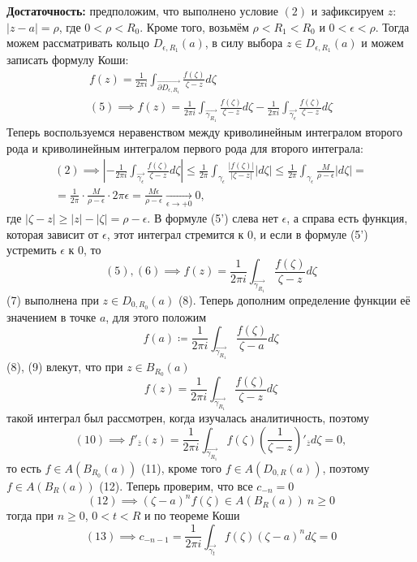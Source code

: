 \documentclass[main]{subfiles}
\begin{document}
\begin{longProof}
    \textbf{Достаточность:} предположим, что выполнено условие $(2)$ и зафиксируем $z$: $|z - a| = \rho$, где $0 < \rho < R_0$.
    Кроме того, возьмём $\rho < R_1 < R_0$ и $0 < \epsilon < \rho$.
    Тогда можем рассматривать кольцо $D_{\epsilon, R_1}(a)$, в силу выбора $z \in D_{\epsilon, R_1}(a)$ и можем записать формулу Коши:
    \begin{gather*}
        f(z) = \frac{1}{2 \pi i} \int_{\overrightarrow{\partial D_{\epsilon, R_1}}} \frac{f(\zeta)}{\zeta - z} d\zeta \tag{5}\\
        (5) \implies f(z) = \frac{1}{2 \pi i } \int_{\overrightarrow{\gamma_{R_1}}} \frac{f(\zeta)}{\zeta - z} d\zeta - \frac{1}{2 \pi i } \int_{\overrightarrow{\gamma_{\epsilon}}} \frac{f(\zeta)}{\zeta - z} d\zeta \tag{5'}
    \end{gather*}
    Теперь воспользуемся неравенством между криволинейным интегралом второго рода и криволинейным интегралом первого рода для второго интеграла:
    \begin{multline*}
        (2) \implies \left| - \frac{1}{2 \pi i } \int_{\overrightarrow{\gamma_{\epsilon}}} \frac{f(\zeta)}{\zeta - z} d\zeta \right| \le \frac{1}{2 \pi} \int_{\gamma_{\epsilon}} \frac{|f(\zeta)|}{|\zeta - z|} |d\zeta| \le \frac{1}{2 \pi} \int_{\gamma_{\epsilon}} \frac{M}{\rho - \epsilon} |d\zeta| = \\
        = \frac{1}{2 \pi} \cdot \frac{M}{\rho - \epsilon} \cdot 2 \pi \epsilon = \frac{M\epsilon}{\rho - \epsilon} \xrightarrow[\epsilon \to +0]{} 0, \tag{6}
    \end{multline*}
    где $|\zeta - z| \ge |z| - |\zeta| = \rho - \epsilon$.
    В формуле (5') слева нет $\epsilon$, а справа есть функция, которая зависит от $\epsilon$, этот интеграл стремится к 0, и если в формуле (5') устремить $\epsilon$ к 0, то
    \[(5), (6) \implies f(z) = \frac{1}{2 \pi i} \int_{\overrightarrow{\gamma_{R_1}}} \frac{f(\zeta)}{\zeta - z} d\zeta \tag{7}\]
    (7) выполнена при $z \in D_{0, R_0} (a)$ (8).
    Теперь дополним определение функции её значением в точке $a$, для этого положим
    \[f(a) \coloneqq \frac{1}{2 \pi i} \int_{\overrightarrow{\gamma_{R_1}}} \frac{f(\zeta)}{\zeta - a} d\zeta \tag{9}\]
    (8), (9) влекут, что при $z \in B_{R_0} (a)$
    \[f(z) = \frac{1}{2 \pi i} \int_{\overrightarrow{\gamma_{R_1}}} \frac{f(\zeta)}{\zeta - z} d\zeta \tag{10}\]
    такой интеграл был рассмотрен, когда изучалась аналитичность, поэтому
    \[(10) \implies f'_{\overline{z}} (z) = \frac{1}{2 \pi i} \int_{\overrightarrow{\gamma_{R_1}}} f(\zeta) \left(\frac{1}{\zeta - z}\right)'_{\overline{z}} d\zeta = 0,\]
    то есть $f \in A(B_{R_0}(a))$ (11), кроме того $f \in A(D_{0, R}(a))$, поэтому $f \in A(B_R(a))$ (12).
    Теперь проверим, что все $c_{-n}=0$
    \[(12) \implies (\zeta - a)^n f(\zeta) \in A(B_{R}(a))\ n \ge 0 \tag{13}\]
    тогда при $n \ge 0$, $0 < t < R$ и по теореме Коши
    \[(13) \implies c_{-n-1} = \frac{1}{2 \pi i} \int_{\overrightarrow{\gamma_t}} f(\zeta)(\zeta - a)^n d\zeta = 0\]
\end{longProof}
\end{document}
